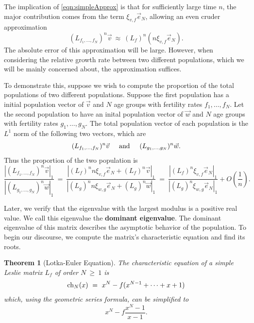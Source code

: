 \documentclass[11pt,reqno]{amsart}
\numberwithin{equation}{section}
\theoremstyle{plain}
\newtheorem{theorem}[thm]{Theorem}
\newcommand{\ch}{\textnormal{ch}}
\begin{document}
The implication of \eqref{eqn:simpleApprox} is that for sufficiently large time $n$, 
the major contribution comes from the term $\xi_{v, f}\vec e_N$, allowing an even cruder approximation 
\begin{equation}\label{eqn:simpleApprox}
        (L_{f_1, \dots, f_N})^n \vec v\ \approx \ 
        (L_f)^n (n\xi_{v, f}\vec e_N).
\end{equation}
The absolute error of this approximation will be large. However, when considering the relative growth rate between two different populations, which we will be mainly concerned about, the approximation suffices. 

To demonstrate this, suppose we wish to compute the proportion of the total populations of two different populations. Suppose the first population has a initial population vector of $\vec v$ and $N$ age groups with fertility rates $f_1, \dots, f_N$. Let the second population to have an inital population vector of $\vec w$ and $N$ age groups with fertility rates $g_1, \dots, g_N$. The total population vector of each population is the $L^1$ norm of the following two vectors, which are
\begin{equation}
 (L_{f_1, \dots, f_N})^n \vec v \hspace{5mm}\textnormal {and}  \hspace{5mm} (L_{g_1, \dots, g_N})^n \vec w. 
\end{equation}
Thus the proportion of the two population is 
\begin{equation}
\frac{|(L_{f_1, \dots, f_N})^n \vec v|_1}{|(L_{g_1, \dots, g_N})^n \vec w|_1} \ = \ 
\frac{
|(L_f)^n n \xi_{v, f} \vec e_N + (L_f)^n \vec v|_1
}{
|(L_g)^n n \xi_{w, g} \vec e_N + (L_g)^n \vec w|_1
}
\ = \ \frac{
|(L_f)^n \xi_{v, f} \vec e_N |_1
}{
|(L_g)^n \xi_{w, g} \vec e_N |_1
}
+ O\left(\frac 1 n \right). 
\end{equation}

Later, we verify that the eigenvalue with the largest modulus is a positive real value. We call this eigenvalue the 
\textbf{dominant eigenvalue}.
The dominant eigenvalue of this matrix describes the asymptotic behavior of the population. To begin our discourse,  we compute the matrix's characteristic equation and find its roots. 


\begin{theorem}[Lotka-Euler Equation]
    \label{LEeq}
    The characteristic equation of a simple Leslie matrix $L_f$ of 
    order $N\ \geq \ 1$ is 
    \[
        \ch_N(x) \ = \ x^N - f(x^{N-1} + \cdots + x + 1)
    \]
    which, using the geometric series formula, can be simplified to 
    \[
        x^{N} - f \frac {x^N - 1} {x - 1}. 
    \]
\end{theorem}
\end{document}
